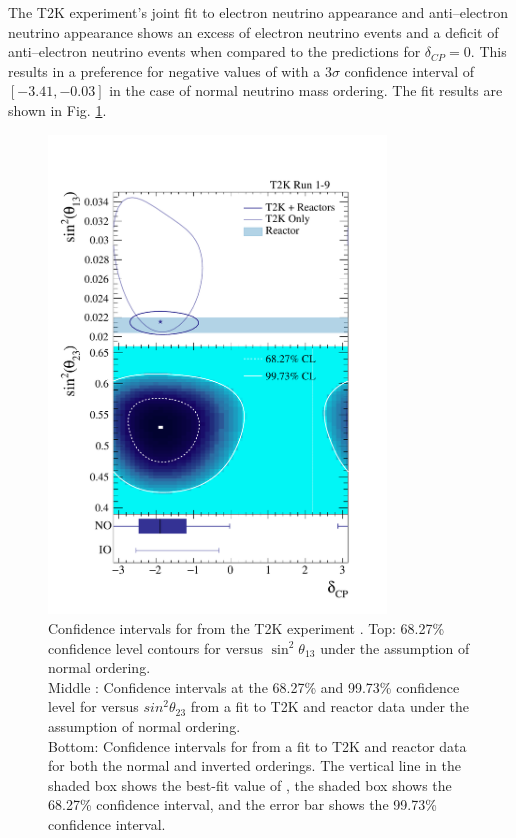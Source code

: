 {The T2K experiment's joint fit to electron neutrino appearance and 
anti--electron neutrino appearance shows an excess of electron neutrino events 
and a deficit of anti--electron neutrino events when compared to the 
predictions for \(\delta_{CP} = 0\). This results in a preference for negative 
values of \dcp{} with a \(3\sigma\) confidence interval of \([-3.41, -0.03]\) 
in the case of normal neutrino mass ordering. The fit results are shown in 
Fig. \ref{fig:t2k_cp}. \cite{Abe2019}
\begin{figure}
	\centering
	\includegraphics[width=0.8\textwidth]{figures/t2k_cp.pdf}
	\caption{Confidence intervals for \dcp{} from the T2K experiment 
	\cite{Abe2019}. 
	Top: 68.27\% confidence level contours for \dcp{} versus $\sin^2\theta_{13}$ 
	under the assumption of normal ordering. \\
	Middle : Confidence intervals at the 68.27\% and 99.73\% confidence level for 
	\dcp{} versus $sin^2\theta_{23}$ from a fit to T2K and reactor data under the 
	assumption of normal ordering. \\
	Bottom: Confidence intervals for \dcp{} from a fit to T2K and reactor data for 
	both the normal and inverted orderings. The vertical line in the shaded box 
	shows the best-fit value of \dcp{}, the shaded box shows the 68.27\% 
	confidence interval, and the error bar shows the 99.73\% confidence interval. 
	}
	\label{fig:t2k_cp}
\end{figure}

}
